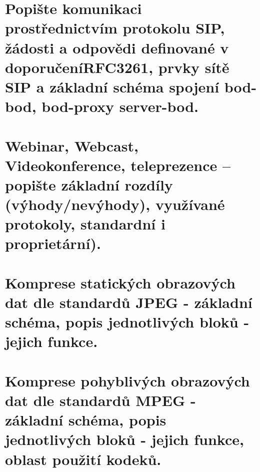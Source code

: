 \newpage
\section[Popište komunikaci prostřednictvím protokolu SIP, žádosti a odpovědi definované v doporučení RFC3261, prvky sítě SIP a základní schéma spojení bod-bod, bod-proxy server-bod.]{Popište komunikaci prostřednictvím protokolu SIP, žádosti a odpovědi definované v doporučení\newline RFC3261, prvky sítě SIP a základní schéma spojení bod-bod, bod-proxy server-bod.}

\newpage
\section{Webinar, Webcast, Videokonference, teleprezence – popište základní rozdíly (výhody/nevýhody), využívané protokoly, standardní i proprietární).}

\newpage
\section{Komprese statických obrazových dat dle standardů JPEG - základní schéma, popis jednotlivých bloků - jejich funkce.}

\newpage
\section{Komprese pohyblivých obrazových dat dle standardů MPEG - základní schéma, popis jednotlivých bloků - jejich funkce, oblast použití kodeků.}